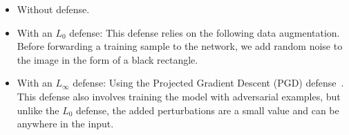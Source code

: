 \begin{itemize}[nosep,nolistsep]
    \item Without defense. %
      \item With an $L_0$ defense: This defense relies on the following data augmentation.
    Before forwarding a training sample to the network, we add random noise to the image in the form of a black rectangle.
        \item With an $L_{\infty}$ defense: Using the Projected Gradient Descent (PGD) defense~\cite{PGD}.
    This defense also involves training the model with adversarial examples, but unlike the $L_0$ defense, the added perturbations are a small value and can be anywhere in the input.
\end{itemize} 

